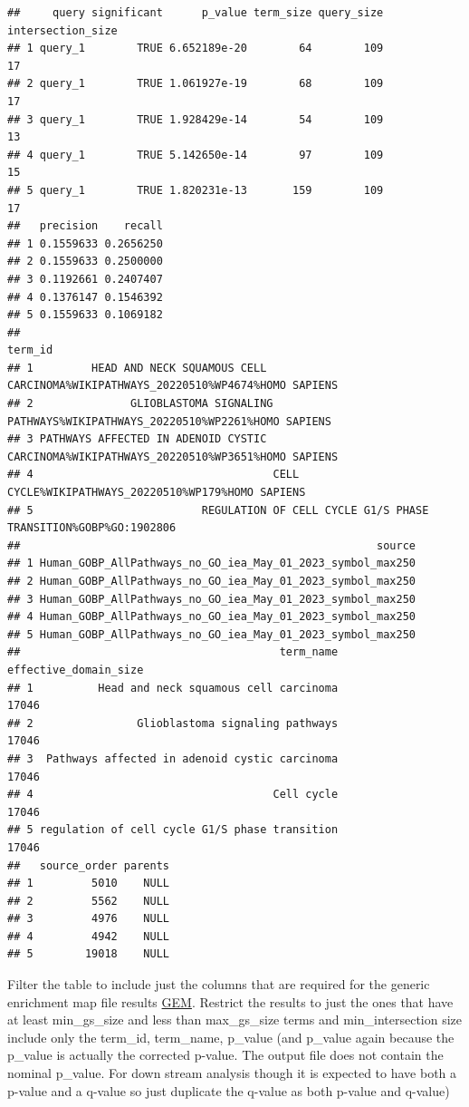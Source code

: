\documentclass[
]{book}
\begin{document}
\begin{verbatim}
##     query significant      p_value term_size query_size intersection_size
## 1 query_1        TRUE 6.652189e-20        64        109                17
## 2 query_1        TRUE 1.061927e-19        68        109                17
## 3 query_1        TRUE 1.928429e-14        54        109                13
## 4 query_1        TRUE 5.142650e-14        97        109                15
## 5 query_1        TRUE 1.820231e-13       159        109                17
##   precision    recall
## 1 0.1559633 0.2656250
## 2 0.1559633 0.2500000
## 3 0.1192661 0.2407407
## 4 0.1376147 0.1546392
## 5 0.1559633 0.1069182
##                                                                                   term_id
## 1         HEAD AND NECK SQUAMOUS CELL CARCINOMA%WIKIPATHWAYS_20220510%WP4674%HOMO SAPIENS
## 2               GLIOBLASTOMA SIGNALING PATHWAYS%WIKIPATHWAYS_20220510%WP2261%HOMO SAPIENS
## 3 PATHWAYS AFFECTED IN ADENOID CYSTIC CARCINOMA%WIKIPATHWAYS_20220510%WP3651%HOMO SAPIENS
## 4                                     CELL CYCLE%WIKIPATHWAYS_20220510%WP179%HOMO SAPIENS
## 5                          REGULATION OF CELL CYCLE G1/S PHASE TRANSITION%GOBP%GO:1902806
##                                                       source
## 1 Human_GOBP_AllPathways_no_GO_iea_May_01_2023_symbol_max250
## 2 Human_GOBP_AllPathways_no_GO_iea_May_01_2023_symbol_max250
## 3 Human_GOBP_AllPathways_no_GO_iea_May_01_2023_symbol_max250
## 4 Human_GOBP_AllPathways_no_GO_iea_May_01_2023_symbol_max250
## 5 Human_GOBP_AllPathways_no_GO_iea_May_01_2023_symbol_max250
##                                        term_name effective_domain_size
## 1          Head and neck squamous cell carcinoma                 17046
## 2                Glioblastoma signaling pathways                 17046
## 3  Pathways affected in adenoid cystic carcinoma                 17046
## 4                                     Cell cycle                 17046
## 5 regulation of cell cycle G1/S phase transition                 17046
##   source_order parents
## 1         5010    NULL
## 2         5562    NULL
## 3         4976    NULL
## 4         4942    NULL
## 5        19018    NULL
\end{verbatim}

Filter the table to include just the columns that are required for the generic enrichment map file results \href{https://enrichmentmap.readthedocs.io/en/latest/FileFormats.html\#generic-results-files}{GEM}. Restrict the results to just the ones that have at least min\_gs\_size and less than max\_gs\_size terms and min\_intersection size include only the term\_id, term\_name, p\_value (and p\_value again because the p\_value is actually the corrected p-value. The output file does not contain the nominal p\_value. For down stream analysis though it is expected to have both a p-value and a q-value so just duplicate the q-value as both p-value and q-value)
\end{document}
